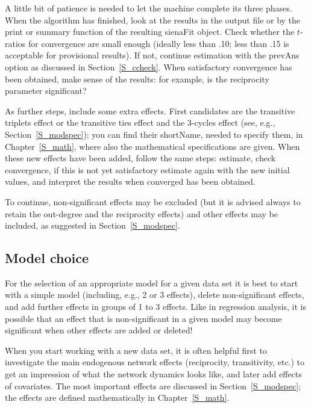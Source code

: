 \documentclass[a4paper,fleqn,11pt]{article}
\newcommand{\+}{\, + \,}
\newcommand{\sfn}[1]{\textsf{#1}}
\begin{document}
A little bit of patience is needed to let the machine complete its three
phases.
When the algorithm has finished, look at the results in the output file
or by the \sfn{print} or \sfn{summary} function of the
resulting \sfn{sienaFit} object. Check
whether the $t$-ratios for convergence are small enough
(ideally less than .10; less than .15 is acceptable for
provisional results).
If not, continue estimation with the \sfn{prevAns} option
as discussed in Section~\ref{S_ccheck}.
When satisfactory convergence has been obtained, make sense
of the results: for example, is the reciprocity parameter significant?

As further steps, include some extra effects. First candidates
are the transitive triplets effect or the transitive ties effect
and the 3-cycles effect (see, e.g., Section~\ref{S_modspec});
you can find their \sfn{shortName},
needed to specify them, in Chapter~\ref{S_math},
where also the mathematical specifications are given.
When these new effects have been added, follow the same steps:
estimate, check convergence, if this is not yet satisfactory
estimate again with the new initial values, and interpret the
results when converged has been obtained.

To continue,  non-significant effects may
be excluded (but it is advised always to retain the out-degree and
the reciprocity effects) and other effects may be included,
as suggested in Section~\ref{S_modspec}.

\subsection{Model choice}
\label{S_model}

For the selection of an appropriate model for a given data set it
is best to start with a simple model (including, e.g., 2 or 3
effects), delete non-significant effects, and add further effects
in groups of 1 to 3 effects. Like in regression analysis, it is
possible that an effect that is non-significant in a given model
may become significant when other effects are added or deleted!

When you start working with a new data set, it is often helpful first
to investigate the main endogenous network effects (reciprocity,
transitivity, etc.) to get an impression of what the network
dynamics looks like, and later add effects of covariates.
The most important effects are discussed in Section~\ref{S_modspec};
the effects are defined mathematically
in Chapter~\ref{S_math}.
\end{document}
